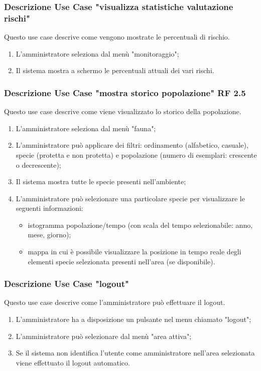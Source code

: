 \subsubsection*{Descrizione Use Case "visualizza statistiche valutazione rischi"}
Questo use case descrive come vengono mostrate le percentuali di rischio.
\begin{enumerate}
    \item L'amministratore seleziona dal menù "monitoraggio";
    \item Il sistema mostra a schermo le percentuali attuali dei vari rischi.
\end{enumerate}

\subsubsection*{Descrizione Use Case "mostra storico popolazione" \textbf{RF 2.5}}
Questo use case descrive come viene visualizzato lo storico della popolazione.
\begin{enumerate}
    \item L'amministratore seleziona dal menù "fauna";
    \item L'amministratore può applicare dei filtri: ordinamento (alfabetico, casuale), specie (protetta e non protetta) e popolazione (numero di esemplari: crescente o decrescente);
    \item Il sistema mostra tutte le specie presenti nell'ambiente;
    \item L'amministratore può selezionare una particolare specie per visualizzare le seguenti informazioni:
    \begin{itemize}
        \item istogramma popolazione/tempo (con scala del tempo selezionabile: anno, mese, giorno);
        \item mappa in cui è possibile visualizzare la posizione in tempo reale degli elementi specie selezionata presenti nell'area (se disponibile).
    \end{itemize}
\end{enumerate}

\subsubsection*{Descrizione Use Case "logout"}
Questo use case descrive come l'amministratore può effettuare il logout.
\begin{enumerate}
    \item L'amministratore ha a disposizione un pulsante nel menu chiamato "logout";
    \item L'amministratore può selezionare dal menù "area attiva";
    \item Se il sistema non identifica l'utente come amministratore nell'area selezionata viene effettuato il logout automatico.
\end{enumerate}

